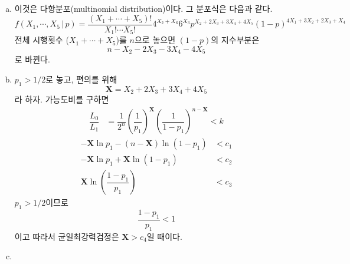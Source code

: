 \documentclass[answers]{exam}
\begin{document}
\begin{questions}
\begin{solution}
    \begin{enumerate}[(a)]
      \item 이것은 다항분포(multinomial distribution)이다. 그 분포식은 다음과 같다.
      \begin{equation}
        f\left(X_{1},\cdots,X_{5}\,|\,p\right) = \dfrac{\left(X_{1}+\cdots +X_{5}\right)!}{X_{1}!\cdots X_{5}!} 4^{X_{2}+X_{6}}6^{X_{3}}p^{X_{2}+2X_{3}+3X_{4}+4X_{5}}\left(1-p\right)^{4X_{1}+3X_{2}+2X_{3}+X_{4}}
      \end{equation}
      전체 시행횟수 ($X_{1}+\cdots+X_{5}$)를 $n$으로 놓으면 $\left(1-p\right)$의 지수부분은
      \begin{equation}
        n-X_{2}-2X_{3}-3X_{4}-4X_{5}
      \end{equation}
      로 바뀐다.
      \item $p_{1}>1/2$로 놓고, 편의를 위해
      \begin{equation}
        \mathbf{X}=X_{2}+2X_{3}+3X_{4}+4X_{5}
      \end{equation}
      라 하자. 가능도비를 구하면
      \begin{align}
        \dfrac{L_{0}}{L_{1}} &= \dfrac{1}{2^{n}}\left(\dfrac{1}{p_{1}}\right)^{\mathbf{X}}\left(\dfrac{1}{1-p_{1}}\right)^{n-\mathbf{X}} < k
      \end{align}
      \begin{align}
        -\mathbf{X}\ln p_{1}-\left(n-\mathbf{X}\right)\ln \left(1-p_{1}\right) &< c_{1}\\
        -\mathbf{X}\ln p_{1}+\mathbf{X}\ln \left(1-p_{1}\right) &< c_{2}\\
        \mathbf{X}\ln\left(\dfrac{1-p_{1}}{p_{1}}\right) &< c_{3}
      \end{align}
      $p_{1}>1/2$이므로
      \begin{equation}
        \dfrac{1-p_{1}}{p_{1}} < 1
      \end{equation}
      이고 따라서 균일최강력검정은 $\mathbf{X}>c_{4}$일 때이다.
      \item 
    \end{enumerate}
   \end{solution}
\end{questions}
\end{document}
